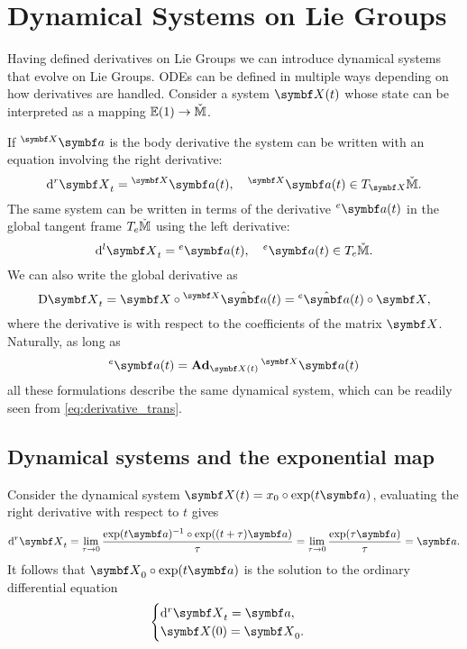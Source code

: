 
\chapter{Dynamical Systems on Lie Groups}

Having defined derivatives on Lie Groups we can introduce dynamical systems that evolve on Lie Groups. ODEs can be defined in multiple ways depending on how derivatives are handled. Consider a system $\X(t)$ whose state can be interpreted as a mapping $\mathbb{E}(1) \rightarrow \check{\mathbb{M}}$.

If $^\X \a$ is the body derivative the system can be written with an equation involving the right derivative:
\begin{equation}
  \mathrm{d}^r \X_t = {^\X}\a(t), \quad {^\X}\a(t) \in T_\X \cM.
\end{equation}
The same system can be written in terms of the derivative ${^\id}\a(t)$ in the global tangent frame $T_e \check{\mathbb{M}}$ using the left derivative:
\begin{equation}
  \mathrm{d}^l \X_t = {^\id}\a(t), \quad {^\id}\a(t) \in T_\id \cM.
\end{equation}
We can also write the global derivative as
\begin{equation}
  \mathrm{D} \X_t = \X \circ {^\X}{\hat\a}(t) = {^\id}{\hat\a}(t) \circ \X,
\end{equation}
where the derivative is with respect to the coefficients of the matrix $\X$. Naturally, as long as
\begin{equation}
  \label{eq:velocity_at_identity}
  {^\id \a(t)} = \bAd_{\X(t)} {^\X \a}(t)
\end{equation}
all these formulations describe the same dynamical system, which can be readily seen from \eqref{eq:derivative_trans}.

\section{Dynamical systems and the exponential map}

Consider the dynamical system $\X(t) = x_0 \circ \exp(t \a)$, evaluating the right derivative with respect to $t$ gives
\begin{equation}
  \mathrm{d}^r \X_t = \lim_{\tau \rightarrow 0} \frac{\exp(t \a)^{-1} \circ \exp((t + \tau) \a)}{\tau} = \lim_{\tau \rightarrow 0} \frac{\exp(\tau \a)}{\tau} = \a.
\end{equation}
It follows that $\X_0 \circ \exp (t \a)$ is the solution to the ordinary differential equation
\begin{equation}
  \begin{cases}
    \mathrm{d}^r \X_t = \a, \\
    \X(0) = \X_0.
  \end{cases}
\end{equation}


